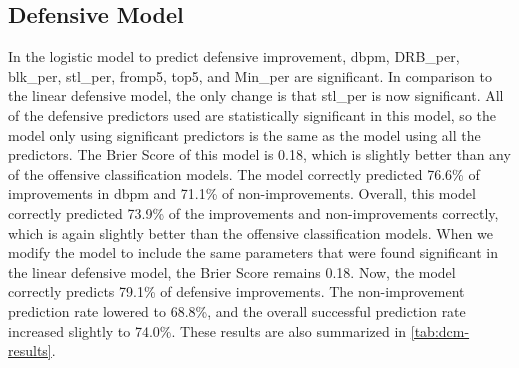 \documentclass[12pt]{article}
\begin{document}
\subsection{Defensive Model}
\label{subsec:dcm}
In the logistic model to predict defensive improvement, dbpm, DRB\_per, blk\_per, stl\_per, fromp5, top5, and Min\_per are significant. In comparison to the linear defensive model, the only change is that stl\_per is now significant. All of the defensive predictors used are statistically significant in this model, so the model only using significant predictors is the same as the model using all the predictors. The Brier Score of this model is 0.18, which is slightly better than any of the offensive classification models. The model correctly predicted 76.6\% of improvements in dbpm and 71.1\% of non-improvements. Overall, this model correctly predicted 73.9\% of the improvements and non-improvements correctly, which is again slightly better than the offensive classification models. When we modify the model to include the same parameters that were found significant in the linear defensive model, the Brier Score remains 0.18. Now, the model correctly predicts 79.1\% of defensive improvements. The non-improvement prediction rate lowered to 68.8\%, and the overall successful prediction rate increased slightly to 74.0\%. These results are also summarized in \autoref{tab:dcm-results}.

\begin{table}[t]
\centering
{}
\caption{Offensive Classification Model Evaluators}
\label{tab:dcm-results}
\end{table}
\end{document}
